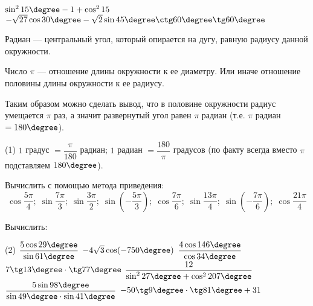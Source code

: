 \begin{class}[number=2]
\begin{listofex}
\begin{tasks}
			\task \( \sin^215\degree-1+\cos^215 \)
			\task \( -\sqrt{27}\cos30\degree-\sqrt{2}\sin45\degree\ctg60\degree\tg60\degree\)
		\end{tasks}
			\end{listofex}
		\begin{definit}
			Радиан --- центральный угол, который опирается на дугу, равную радиусу данной окружности.
		\end{definit}
		\begin{definit}
			Число \( \pi \) --- отношение длины окружности к ее диаметру. Или иначе отношение половины длины окружности к ее радиусу.
		\end{definit}
		Таким образом можно сделать вывод, что в половине окружности радиус умещается \( \pi \) раз, а значит развернутый угол равен \( \pi \) радиан (т.е. \( \pi \) радиан \( = 180\degree \)).
		\begin{tasks}(1)
			\task \( 1 \) градус \( = \dfrac{\pi}{180} \) радиан;
			\task \( 1 \) радиан \( = \dfrac{180}{\pi}\) градусов (по факту всегда вместо \( \pi \) подставляем \( 180\degree \)).
		\end{tasks}
		\begin{listofex}[resume]
			\item Вычислить с помощью метода приведения:
			\[ \cos\dfrac{5\pi}{4};\;\sin\dfrac{7\pi}{3};\;\sin\dfrac{3\pi}{2};\;\sin\left( -\dfrac{5\pi}{3} \right);\;\cos\dfrac{7\pi}{6};\;\sin\dfrac{13\pi}{4};\;\sin\left( -\dfrac{7\pi}{6}  \right);\;\cos\dfrac{21\pi}{4} \]
		\item Вычислить:
		\begin{tasks}(2)
			\task \( \dfrac{5\cos29\degree}{\sin61\degree} \)
			\task \( -4\sqrt{3}\cos(-750\degree) \)
			\task \( \dfrac{4\cos146\degree}{\cos34\degree} \)
			\task \( 7\tg13\degree\cdot\tg77\degree \)
			\task \( \dfrac{12}{\sin^227\degree+\cos^2207\degree} \)
			\task \( \dfrac{5\sin98\degree}{\sin49\degree\cdot\sin41\degree} \)
			\task \( -50\tg9\degree\cdot\tg81\degree+31 \)
		\end{tasks}
		\end{listofex}
\end{class}

